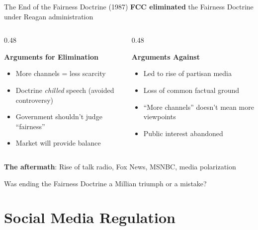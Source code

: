 ﻿\documentclass[aspectratio=169,11pt]{beamer}
\begin{document}
\begin{frame}{The End of the Fairness Doctrine (1987)}
\textbf{FCC eliminated} the Fairness Doctrine under Reagan administration

\vspace{0.2cm}
\begin{columns}[T]
\begin{column}{0.48\textwidth}
\begin{block}{\textbf{Arguments for Elimination}}
\begin{itemize}
    \item More channels = less scarcity
    \item Doctrine \textit{chilled} speech (avoided controversy)
    \item Government shouldn't judge ``fairness''
    \item Market will provide balance
\end{itemize}
\end{block}
\end{column}

\begin{column}{0.48\textwidth}
\begin{block}{\textbf{Arguments Against}}
\begin{itemize}
    \item Led to rise of partisan media
    \item Loss of common factual ground
    \item ``More channels'' doesn't mean more viewpoints
    \item Public interest abandoned
\end{itemize}
\end{block}
\end{column}
\end{columns}

\vspace{0.3cm}
\textbf{The aftermath}: Rise of talk radio, Fox News, MSNBC, media polarization

\begin{discussionbox}[Discussion]
Was ending the Fairness Doctrine a Millian triumph or a mistake?
\end{discussionbox}
\end{frame}


\section{Social Media Regulation}
\end{document}
